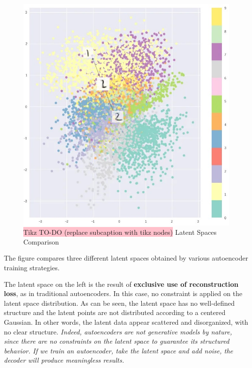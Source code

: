 \begin{figure}[!htbp]
\begin{minipage}[t]{.3\textwidth}
    \end{minipage}  
    \hfill
    \begin{minipage}[t]{.3\textwidth}
        \centering
        \includegraphics[width=\textwidth]{tikz/chapter9 - Latent Space VAEs 3.jpeg}
    \end{minipage}  
    \caption{{\color{red}\colorbox{pink}{Tikz TO-DO (replace subcaption with tikz nodes)}} Latent Spaces Comparison}
\end{figure}

The figure compares three different latent spaces obtained by various autoencoder training strategies. 

The latent space on the left is the result of \textbf{exclusive use of reconstruction loss}, as in traditional autoencoders. In this case, no constraint is applied on the latent space distribution. As can be seen, the latent space has no well-defined structure and the latent points are not distributed according to a centered Gaussian. In other words, the latent data appear scattered and disorganized, with no clear structure. \textit{Indeed, autoencoders are not generative models by nature, since there are no constraints on the latent space to guarantee its structured behavior. If we train an autoencoder, take the latent space and add noise, the decoder will produce meaningless results. }

